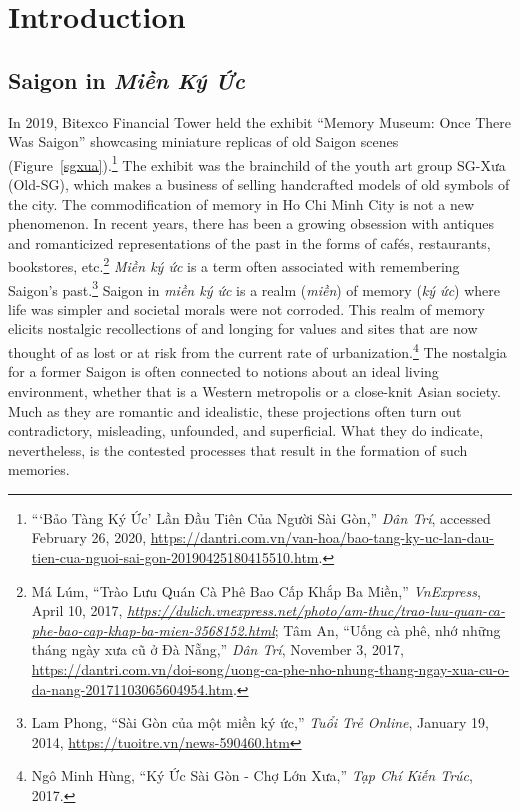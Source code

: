 \chapter{Introduction}\label{intro}
\vi
\section{Saigon in \textit{Miền Ký Ức}}
\vi In 2019, Bitexco Financial Tower held the exhibit “Memory Museum: Once There Was Saigon” showcasing miniature replicas of old Saigon scenes (Figure~\ref{sgxua}).\footnote{“‘Bảo Tàng Ký Ức’ Lần Đầu Tiên Của Người Sài Gòn,” \textit{Dân Trí}, accessed February 26, 2020, \url{https://dantri.com.vn/van-hoa/bao-tang-ky-uc-lan-dau-tien-cua-nguoi-sai-gon-20190425180415510.htm}.} The exhibit was the brainchild of the youth art group SG-Xưa (Old-SG), which makes a business of selling handcrafted models of old symbols of the city. The commodification of memory in Ho Chi Minh City is not a new phenomenon. In recent years, there has been a growing obsession with antiques and romanticized representations of the past in the forms of cafés, restaurants, bookstores, etc.\footnote{Má Lúm, “Trào Lưu Quán Cà Phê Bao Cấp Khắp Ba Miền,” \textit{VnExpress}, April 10, 2017, \textit{\url{https://dulich.vnexpress.net/photo/am-thuc/trao-luu-quan-ca-phe-bao-cap-khap-ba-mien-3568152.html}}; Tâm An, “Uống cà phê, nhớ những tháng ngày xưa cũ ở Đà Nẵng,” \textit{Dân Trí}, November 3, 2017, \url{https://dantri.com.vn/doi-song/uong-ca-phe-nho-nhung-thang-ngay-xua-cu-o-da-nang-20171103065604954.htm}.} \textit{Miền ký ức} is a term often associated with remembering Saigon's past.\footnote{Lam Phong, “Sài Gòn của một miền ký ức,” \textit{Tuổi Trẻ Online}, January 19, 2014, \url{https://tuoitre.vn/news-590460.htm}} Saigon in \textit{miền ký ức} is a realm (\textit{miền}) of memory (\textit{ký ức}) where life was simpler and societal morals were not corroded. This realm of memory elicits nostalgic recollections of and longing for values and sites that are now thought of as lost or at risk from the current rate of urbanization.\footnote{Ngô Minh Hùng, “Ký Ức Sài Gòn - Chợ Lớn Xưa,” \textit{Tạp Chí Kiến Trúc}, 2017.} The nostalgia for a former Saigon is often connected to notions about an ideal living environment, whether that is a Western metropolis or a close-knit Asian society. Much as they are romantic and idealistic, these projections often turn out contradictory, misleading, unfounded, and superficial. What they do indicate, nevertheless, is the contested processes that result in the formation of such memories. 
\en

